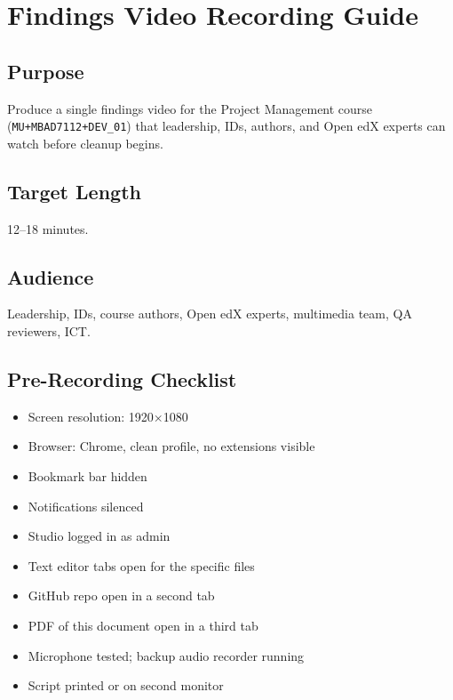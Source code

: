 \chapter{Findings Video Recording Guide}
\label{app:video}

\section{Purpose}

Produce a single findings video for the Project Management course
(\texttt{MU+MBAD7112+DEV\_01}) that leadership, IDs, authors, and
Open edX experts can watch before cleanup begins.

\section{Target Length}

12--18 minutes.

\section{Audience}

Leadership, IDs, course authors, Open edX experts, multimedia team,
QA reviewers, ICT.

\section{Pre-Recording Checklist}

\begin{itemize}
  \item[$\square$] Screen resolution: 1920$\times$1080
  \item[$\square$] Browser: Chrome, clean profile, no extensions visible
  \item[$\square$] Bookmark bar hidden
  \item[$\square$] Notifications silenced
  \item[$\square$] Studio logged in as admin
  \item[$\square$] Text editor tabs open for the specific files
  \item[$\square$] GitHub repo open in a second tab
  \item[$\square$] PDF of this document open in a third tab
  \item[$\square$] Microphone tested; backup audio recorder running
  \item[$\square$] Script printed or on second monitor
\end{itemize}

